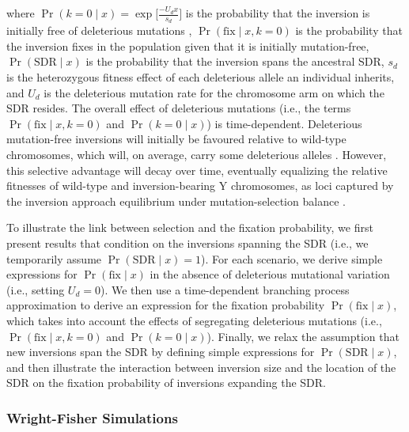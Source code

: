 \documentclass{article}
\begin{document}
\noindent where $\Pr(k = 0 \mid x) = \exp \big[\frac{-U_d x}{s_d} \big]$ is the probability that the inversion is initially free of deleterious mutations \cite[e.g.][]{Nei1967,OrrKim1998}, $\Pr(\text{fix} \mid x, k=0)$ is the probability that the inversion fixes in the population given that it is initially mutation-free, $\Pr(\text{SDR} \mid x)$ is the probability that the inversion spans the ancestral SDR, $s_d$ is the heterozygous fitness effect of each deleterious allele an individual inherits, and $U_d$ is the deleterious mutation rate for the chromosome arm on which the SDR resides. The overall effect of deleterious mutations (i.e., the terms $\Pr(\text{fix} \mid x, k=0)$ and $\Pr(k = 0 \mid x)$) is time-dependent. Deleterious mutation-free inversions will initially be favoured relative to wild-type chromosomes, which will, on average, carry some deleterious alleles \citep{Nei1967,OhtaKojima1968, KimuraOhta1970}. However, this selective advantage will decay over time, eventually equalizing the relative fitnesses of wild-type and inversion-bearing Y chromosomes, as loci captured by the inversion approach equilibrium under mutation-selection balance \citep{Nei1967}. 

To illustrate the link between selection and the fixation probability, we first present results that condition on the inversions spanning the SDR (i.e., we temporarily assume $\Pr(\text{SDR} \mid x) = 1$). For each scenario, we derive simple expressions for $\Pr(\text{fix} \mid x)$ in the absence of deleterious mutational variation (i.e., setting $U_d = 0$). We then use a time-dependent branching process approximation to derive an expression for the fixation probability $\Pr(\text{fix} \mid x)$, which takes into account the effects of segregating deleterious mutations (i.e., $\Pr(\text{fix} \mid x, k=0)$ and $\Pr(k=0 \mid x)$). Finally, we relax the assumption that new inversions span the SDR by defining simple expressions for $\Pr(\text{SDR} \mid x)$, and then illustrate the interaction between inversion size and the location of the SDR on the fixation probability of inversions expanding the SDR.


\subsubsection*{Wright-Fisher Simulations}
\end{document}

